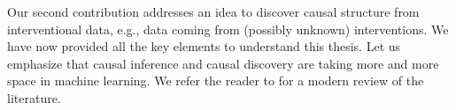 Our second contribution addresses an idea to discover causal structure from interventional data, e.g., data coming from (possibly unknown) interventions. 
We have now provided all the key elements to understand this thesis. 
Let us emphasize that causal inference and causal discovery are taking more and more space in machine learning. 
We refer the reader to \citep{scholkopf2019causality} for a modern review of the literature.

